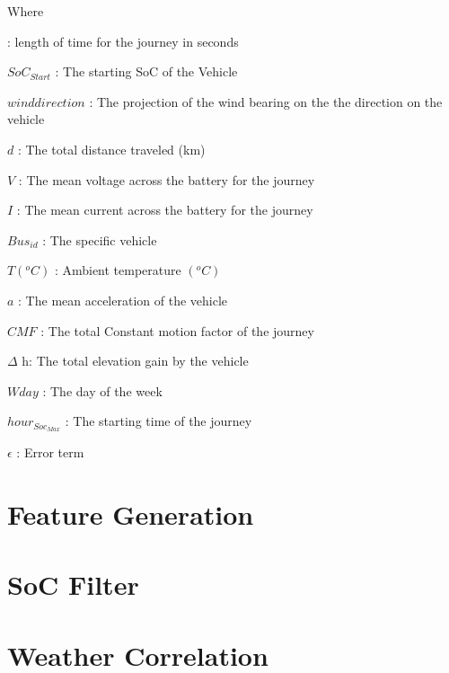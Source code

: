 \documentclass{article}
\begin{document}
\noindent Where
\begin{description}[labelindent=10pt,labelsep=10pt]
\item[$t$] : length of time for the journey in seconds 
\item $SoC_{Start}$ : The starting SoC of the Vehicle 
\item $wind direction$ : The projection of the wind bearing on the the direction on the vehicle
\item $d$ : The total distance traveled (km)
\item $V$ : The mean voltage across the battery for the journey 
\item $I$ : The mean current across the battery for the journey 
\item $Bus_{id}$ : The specific vehicle 
\item $T(^oC)$ : Ambient temperature $(^oC)$ 
\item $a$ : The mean acceleration of the vehicle 
\item $CMF$ : The total Constant motion factor  of the journey 
\item $\Delta$ h: The total elevation gain by the vehicle 
\item $Wday$ : The day of the week
\item $hour_{Soc_{Max}}$ : The starting time of the journey 
\item $\epsilon$ : Error term
\end{description}

\newpage




\appendix
\section{Feature Generation}

\section{SoC Filter}

\section{Weather Correlation}
\end{document}
